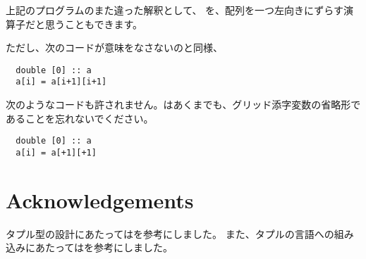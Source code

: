\documentclass{jsarticle}
\begin{document}
上記のプログラムのまた違った解釈として、
\lit{[+1]}を、配列を一つ左向きにずらす演算子だと思うこともできます。

ただし、次のコードが意味をなさないのと同様、

\begin{lstlisting}
  double [0] :: a
  a[i] = a[i+1][i+1]
\end{lstlisting}

次のようなコードも許されません。\lit{[+1]}はあくまでも、グリッド添字変数の省略形であることを忘れないでください。

\begin{lstlisting}
  double [0] :: a
  a[i] = a[+1][+1]
\end{lstlisting}


\newpage

\section*{Acknowledgements}

タプル型の設計にあたっては\citet{pierce2002types}を参考にしました。
また、タプルの言語への組み込みにあたっては\citet{oliveira2015modular}を参考にしました。





\end{document}
